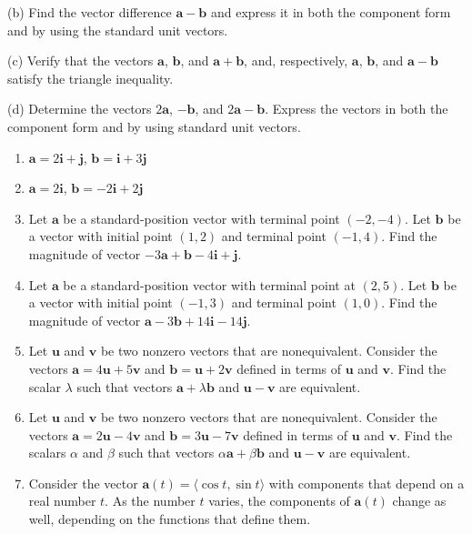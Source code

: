 \documentclass{exercises}
\begin{document}
(b) Find the vector difference $\mathbf{a}-\mathbf{b}$ and express it in both the component form and by using the standard unit vectors.


(c) Verify that the vectors $\mathbf{a}$, $\mathbf{b}$, and $\mathbf{a}+\mathbf{b}$, and, respectively, $\mathbf{a}$, $\mathbf{b}$, and $\mathbf{a}-\mathbf{b}$ satisfy the triangle inequality.


(d) Determine the vectors $2\mathbf{a}$, $-\mathbf{b}$, and $2\mathbf{a}-\mathbf{b}$. Express the vectors in both the component form and by using standard unit vectors.

\begin{enumerate}[resume]
\item $\mathbf{a}=2\mathbf{i}+\mathbf{j}$, $\mathbf{b}=\mathbf{i}+3\mathbf{j}$
\item $\mathbf{a}=2\mathbf{i}$, $\mathbf{b}=-2\mathbf{i}+2\mathbf{j}$
\item Let $\mathbf{a}$ be a standard-position vector with terminal point $(-2,-4)$. Let $\mathbf{b}$ be a vector with initial point $(1,2)$ and terminal point $(-1,4)$. Find the magnitude of vector $-3\mathbf{a}+\mathbf{b}-4\mathbf{i}+\mathbf{j}$.
\item Let $\mathbf{a}$ be a standard-position vector with terminal point at $(2,5)$. Let $\mathbf{b}$ be a vector with initial point $(-1,3)$ and terminal point $(1,0)$. Find the magnitude of vector $\mathbf{a}-3\mathbf{b}+14\mathbf{i}-14\mathbf{j}$.
\item Let $\mathbf{u}$ and $\mathbf{v}$ be two nonzero vectors that are nonequivalent. Consider the vectors $\mathbf{a}=4\mathbf{u}+5\mathbf{v}$ and $\mathbf{b}=\mathbf{u}+2\mathbf{v}$ defined in terms of $\mathbf{u}$ and $\mathbf{v}$. Find the scalar $\lambda$ such that vectors $\mathbf{a}+\lambda \mathbf{b}$ and $\mathbf{u}-\mathbf{v}$ are equivalent.
\item Let $\mathbf{u}$ and $\mathbf{v}$ be two nonzero vectors that are nonequivalent. Consider the vectors $\mathbf{a}=2\mathbf{u}-4\mathbf{v}$ and $\mathbf{b}=3\mathbf{u}-7\mathbf{v}$ defined in terms of $\mathbf{u}$ and $\mathbf{v}$. Find the scalars $\alpha$ and $\beta$ such that vectors $\alpha \mathbf{a}+\beta \mathbf{b}$ and $\mathbf{u}-\mathbf{v}$ are equivalent.
\item Consider the vector $\mathbf{a}(t)=\langle \cos t,\sin t\rangle$ with components that depend on a real number $t$. As the number $t$ varies, the components of $\mathbf{a}(t)$ change as well, depending on the functions that define them.
\begin{enumerate}[label=(\alph*)]

\end{enumerate}
\end{enumerate}
\end{document}
